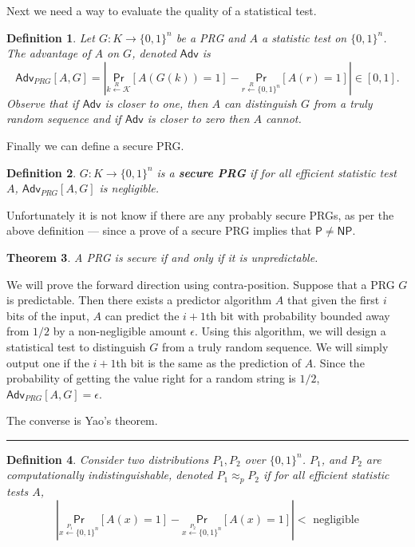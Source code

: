 \documentclass[twoside]{article}
\newcounter{lecnum}
\newtheorem{theorem}{Theorem}[lecnum]
\newtheorem{definition}[theorem]{Definition}
\newenvironment{proof}{{\bf Proof:}}{\hfill\rule{2mm}{2mm}}
\def\Pr{\mathsf{Pr}}
\def\K{\mathcal{K}}
\def\Adv{\mathsf{Adv}}
\begin{document}
Next we need a way to evaluate the quality of a statistical test.
\begin{definition}
Let $G: K \rightarrow \{0,1\}^n$ be a PRG and $A$ a statistic test on $\{0,1\}^n$.  The advantage of $A$ on $G$, denoted $\Adv$ is 
\[\Adv_{PRG}[A, G] = \left| \underset{k \xleftarrow{R} \K}{\Pr}[A(G(k)) = 1] - \underset{r \xleftarrow{R} \{0,1\}^n}{\Pr}[A(r) = 1]\right| \in [0,1].\]
Observe that if $\Adv$ is closer to one, then $A$ can distinguish $G$ from a truly random sequence and if $\Adv$ is closer to zero then $A$ cannot.
\end{definition}

Finally we can define a secure PRG.
\begin{definition}
$G: K \rightarrow \{0,1\}^n$ is a \textbf{secure PRG} if for all efficient statistic test $A$, $\Adv_{PRG}[A, G]$ is negligible.  
\end{definition} 
Unfortunately it is not know if there are any probably secure PRGs, as per the above definition --- since a prove of a secure PRG implies that $\mathsf{P} \neq \mathsf{NP}$. 

\begin{theorem}
A PRG is secure if and only if it is unpredictable.
\end{theorem}
\begin{proof}
We will prove the forward direction using contra-position. Suppose that a PRG $G$ is predictable. Then there exists a predictor algorithm $A$ that given the first $i$ bits of the input, $A$ can predict the $i+1$th bit with probability bounded away from $1/2$ by a non-negligible amount $\epsilon$. Using this algorithm, we will design a statistical test to distinguish $G$ from a truly random sequence. We will simply output one if the $i+1$th bit is the same as the prediction of $A$. Since the probability of getting the value right for a random string is $1/2$, $\Adv_{PRG}[A, G] = \epsilon$. 

The converse is Yao's theorem.
\end{proof}

\begin{definition}
Consider two distributions $P_1, P_2$ over $\{0,1\}^n$. $P_1$, and $P_2$ are computationally indistinguishable, denoted $P_1 \approx_p P_2$ if for all efficient statistic tests $A$, 
\[\left| \underset{x \xleftarrow{P_1} \{0,1\}^n}{\Pr}[A(x) = 1] - \underset{x \xleftarrow{P_2} \{0,1\}^n}{\Pr}[A(x) = 1] \right| < \mbox{ negligible} \]
\end{definition}
\end{document}
